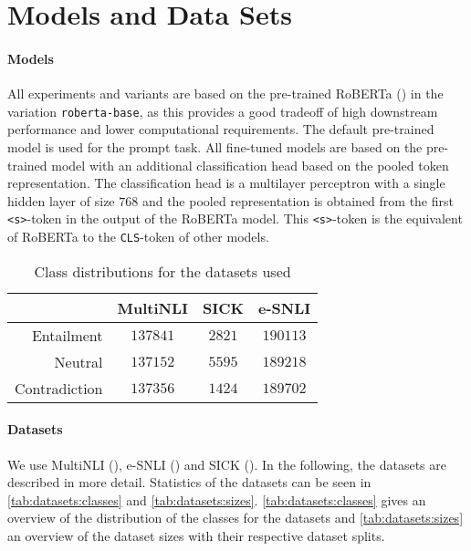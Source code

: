 \documentclass[12pt,a4paper]{article}
\begin{document}
\section{Models and Data Sets} \label{sec:models_datasets}
\paragraph{Models}
All experiments and variants are based on the pre-trained \acf{RoBERTa} (\cite{roberta}) in the variation \texttt{roberta-base}, as this provides a good tradeoff of high downstream performance and lower computational requirements. The default pre-trained model is used for the prompt task. All fine-tuned models are based on the pre-trained model with an additional classification head based on the pooled token representation. The classification head is a multilayer perceptron with a single hidden layer of size $768$ and the pooled representation is obtained from the first \texttt{<s>}-token in the output of the \acs{RoBERTa} model. This \texttt{<s>}-token is the equivalent of \acs{RoBERTa} to the \texttt{CLS}-token of other models.

\begin{table}[h]
    \centering
    \caption{Class distributions for the datasets used}
    \begin{tabular}{r || c | c | c}
        & \acs{MultiNLI} & \acs{SICK} & \acs{e-SNLI} \\
        \hline
        Entailment & $137841$ & $2821$ & $190113$ \\
        Neutral & $137152$ & $5595$ & $189218$ \\
        Contradiction & $137356$ & $1424$ & $189702$
    \end{tabular}
    \label{tab:datasets:classes}
\end{table}

\paragraph{Datasets} We use \acs{MultiNLI} (\cite{multinli}), \acs{e-SNLI} (\cite{esnli}) and \acs{SICK} (\cite{sick}). In the following, the datasets are described in more detail. Statistics of the datasets can be seen in \autoref{tab:datasets:classes} and \autoref{tab:datasets:sizes}. \autoref{tab:datasets:classes} gives an overview of the distribution of the classes for the datasets and \autoref{tab:datasets:sizes} an overview of the dataset sizes with their respective dataset splits.
\end{document}
